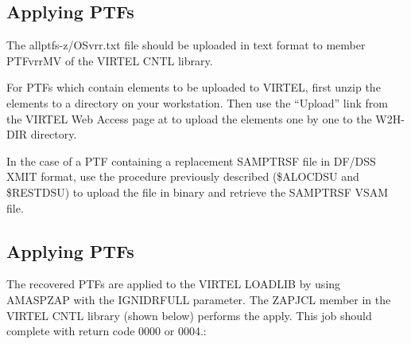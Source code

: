 \documentclass[letterpaper,10pt,english]{sphinxmanual}
\begin{document}
\subsection{Applying PTFs}
\label{\detokenize{Installation_Guide:applying-ptfs}}
The allptfs-z/OSvrr.txt file should be uploaded in text format to member PTFvrrMV of the VIRTEL CNTL library.

For PTFs which contain elements to be uploaded to VIRTEL, first unzip the elements to a directory on your workstation. Then use the “Upload” link from the VIRTEL Web Access page at  to upload the elements one by one to the W2H-DIR directory.

In the case of a PTF containing a replacement SAMPTRSF file in DF/DSS XMIT format, use the procedure previously described (\$ALOCDSU and \$RESTDSU) to upload the file in binary and retrieve the SAMPTRSF VSAM file.


\subsection{Applying PTFs}
\label{\detokenize{Installation_Guide:id1}}
The recovered PTFs are applied to the VIRTEL LOADLIB by using AMASPZAP with the IGNIDRFULL parameter. The ZAPJCL member in the VIRTEL CNTL library (shown below) performs the apply. This job should complete with return code 0000 or 0004.:

\begin{sphinxVerbatim}[commandchars=\\\{\}]
  
   
  
  
  
  
  
  
  
\end{sphinxVerbatim}
\end{document}
